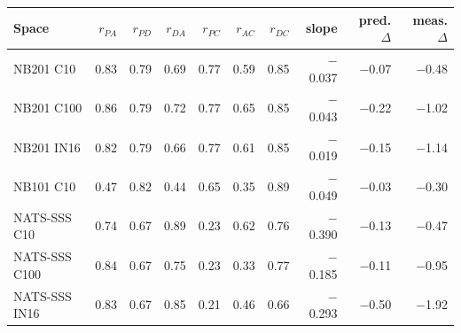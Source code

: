 \begin{tabular}{@{}lrrrrrrrrr@{}}
\toprule
Space & $r_{PA}$ & $r_{PD}$ & $r_{DA}$ & $r_{PC}$ & $r_{AC}$ & $r_{DC}$ & slope & pred. $\Delta$ & meas. $\Delta$\\
\midrule
NB201 C10 & 0.83 & 0.79 & 0.69 & 0.77 & 0.59 & 0.85 & $-$0.037 & $-$0.07 & $-$0.48\\
NB201 C100 & 0.86 & 0.79 & 0.72 & 0.77 & 0.65 & 0.85 & $-$0.043 & $-$0.22 & $-$1.02\\
NB201 IN16 & 0.82 & 0.79 & 0.66 & 0.77 & 0.61 & 0.85 & $-$0.019 & $-$0.15 & $-$1.14\\
NB101 C10 & 0.47 & 0.82 & 0.44 & 0.65 & 0.35 & 0.89 & $-$0.049 & $-$0.03 & $-$0.30\\
NATS-SSS C10 & 0.74 & 0.67 & 0.89 & 0.23 & 0.62 & 0.76 & $-$0.390 & $-$0.13 & $-$0.47\\
NATS-SSS C100 & 0.84 & 0.67 & 0.75 & 0.23 & 0.33 & 0.77 & $-$0.185 & $-$0.11 & $-$0.95\\
NATS-SSS IN16 & 0.83 & 0.67 & 0.85 & 0.21 & 0.46 & 0.66 & $-$0.293 & $-$0.50 & $-$1.92\\
\bottomrule
\end{tabular}
